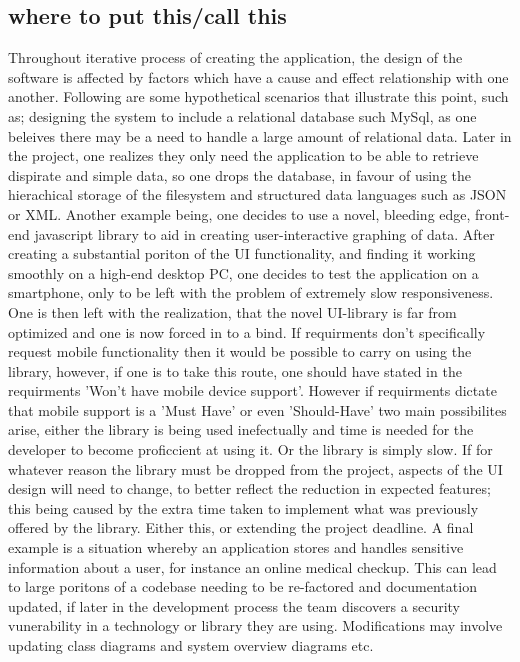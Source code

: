       \subsection{where to put this/call this}
      Throughout iterative process of creating the application, the design of the software is affected by factors which have a cause and effect relationship with one another. Following are some hypothetical scenarios that illustrate this point, such as; designing the system to include a relational database such MySql, as one beleives there may be a need to handle a large amount of  relational data. Later in the project, one realizes they only need the application to be able to retrieve dispirate and simple data, so one drops the database, in favour of using the hierachical storage of the filesystem and structured data languages such as JSON or XML. Another example being, one decides to use a novel, bleeding edge, front-end javascript library to aid in creating user-interactive graphing of data. After creating a substantial poriton of the UI functionality, and finding it working smoothly on a high-end desktop PC, one decides to test the application on a smartphone, only to be left with the problem of extremely slow responsiveness. One is then left with the realization, that the novel UI-library is far from optimized and one is now forced in to a bind. If requirments don't specifically request mobile functionality then it would be possible to carry on using the library, however, if one is to take this route, one should have stated in the requirments 'Won't have mobile device support'. However if requirments dictate that mobile support is a 'Must Have' or even 'Should-Have' two main possibilites arise, either the library is being used inefectually and time is needed for the developer to become proficcient at using it. Or the library is simply slow. If for whatever reason the library must be dropped from the project, aspects of the UI design will need to change, to better reflect the reduction in expected features; this being caused by the extra time taken to implement what was previously offered by the library. Either this, or extending the project deadline. A final example is a situation whereby an application stores and handles sensitive information about a user, for instance an online medical checkup. This can lead to large poritons of a codebase needing to be re-factored and documentation updated, if later in the development process the team discovers a security vunerability in a technology or library they are using. Modifications may involve updating class diagrams and system overview diagrams etc.

